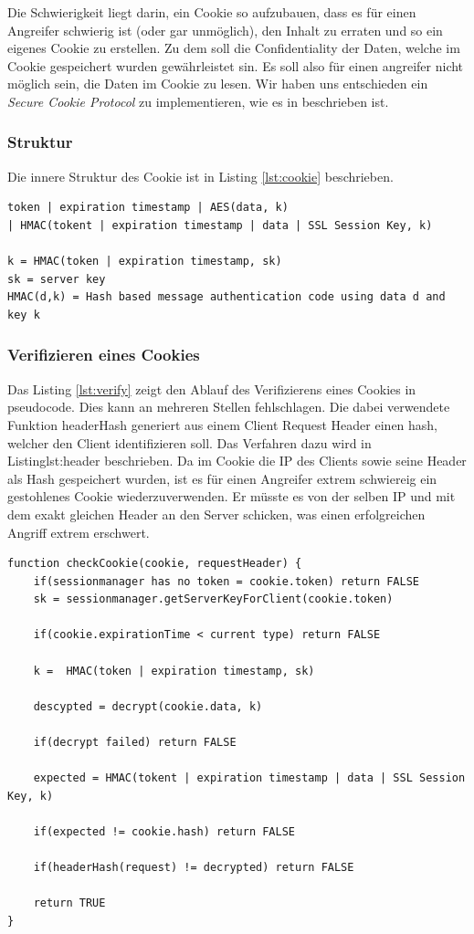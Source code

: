 Die Schwierigkeit liegt darin, ein Cookie so aufzubauen, dass es für einen Angreifer schwierig ist (oder gar unmöglich), den Inhalt zu
erraten und so ein eigenes Cookie zu erstellen. Zu dem soll die Confidentiality der Daten, welche im Cookie gespeichert wurden
gewährleistet sin. Es soll also für einen angreifer nicht möglich sein, die Daten im Cookie zu lesen. Wir haben uns entschieden
ein \textit{Secure Cookie Protocol} zu implementieren, wie es in \cite{securecookie} beschrieben ist.

\subsubsection{Struktur}

Die innere Struktur des Cookie ist in Listing \ref{lst:cookie} beschrieben.

\begin{lstlisting}[caption=Innere Struktur des Cookie,label={lst:cookie}]
token | expiration timestamp | AES(data, k) 
| HMAC(tokent | expiration timestamp | data | SSL Session Key, k)

k = HMAC(token | expiration timestamp, sk)
sk = server key
HMAC(d,k) = Hash based message authentication code using data d and key k
\end{lstlisting}

\subsubsection{Verifizieren eines Cookies}

Das Listing \ref{lst:verify} zeigt den Ablauf des Verifizierens eines Cookies in pseudocode. 
Dies kann an mehreren Stellen fehlschlagen. Die dabei verwendete Funktion headerHash generiert 
aus einem Client Request Header einen hash, welcher den Client identifizieren soll. Das Verfahren
dazu wird in Listing{lst:header} beschrieben. Da im Cookie die IP des Clients sowie seine Header
als Hash gespeichert wurden, ist es für einen Angreifer extrem schwiereig ein gestohlenes Cookie
wiederzuverwenden. Er müsste es von der selben IP und mit dem exakt gleichen Header an den Server
schicken, was einen erfolgreichen Angriff extrem erschwert.
\newline
\begin{lstlisting}[caption=Verifikation eines Cookies,label={lst:verify}]
function checkCookie(cookie, requestHeader) {
    if(sessionmanager has no token = cookie.token) return FALSE
    sk = sessionmanager.getServerKeyForClient(cookie.token)

    if(cookie.expirationTime < current type) return FALSE

    k =  HMAC(token | expiration timestamp, sk)

    descypted = decrypt(cookie.data, k)

    if(decrypt failed) return FALSE

    expected = HMAC(tokent | expiration timestamp | data | SSL Session Key, k)

    if(expected != cookie.hash) return FALSE

    if(headerHash(request) != decrypted) return FALSE

    return TRUE
}
\end{lstlisting}

